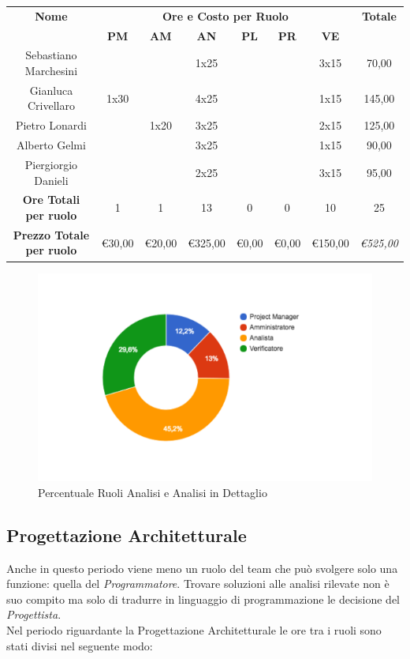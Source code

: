 \documentclass[12pt,a4paper,titlepage]{article}
\begin{document}
	{\renewcommand\arraystretch{1.2} %
		\small
		\begin{tabular}{|c|c|c|c|c|c|c|c|}
			\hline 
			\textbf{Nome} & \multicolumn{6}{c|}{\textbf{Ore e Costo per Ruolo}} & \textbf{Totale} \\ 
			& \textbf{PM} & \textbf{AM} & \textbf{AN} & \textbf{PL} & \textbf{PR} & \textbf{VE} & \textbf{} \\ 
			\hline
			Sebastiano Marchesini & & & 1x25 & & & 3x15 & 70,00 \\ 
			\hline 
			Gianluca Crivellaro & 1x30 & & 4x25 & & & 1x15 & 145,00 \\ 
			\hline 
			Pietro Lonardi & & 1x20 & 3x25 & & & 2x15 & 125,00 \\ 
			\hline 
			Alberto Gelmi & & & 3x25 & & & 1x15 & 90,00 \\ 
			\hline 
			Piergiorgio Danieli & & & 2x25 & & & 3x15 & 95,00 \\ 
			\hline
			\hline
			\textbf{Ore Totali per ruolo} & 1 & 1 & 13 & 0 & 0 & 10 & 25 \\  
			\textbf{Prezzo Totale per ruolo}&\euro 30,00&\euro 20,00&\euro 325,00&\euro 0,00&\euro 0,00&\euro 150,00& \textit{\euro 525,00} \\
			\hline  
	\end{tabular}} 

	\begin{figure}[p]
		\centering
		\includegraphics[width=0.7\linewidth]{"CiambellaAnalisi"}
		\caption{Percentuale Ruoli Analisi e Analisi in Dettaglio}
		\label{fig:ciambella-progettazione-analisi}
	\end{figure} 
	
	
	\subsection{Progettazione Architetturale}
	Anche in questo periodo viene meno un ruolo del team che può svolgere solo una funzione: quella del \textit{Programmatore}. Trovare soluzioni alle analisi rilevate non è suo compito ma solo di tradurre in linguaggio di programmazione le decisione del \textit{Progettista}.\\
	Nel periodo riguardante la Progettazione Architetturale le ore tra i ruoli sono stati divisi nel seguente modo:\\
	
\end{document}
